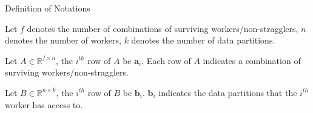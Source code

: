 \documentclass{beamer}
\begin{document}


\begin{frame}{Definition of Notations}

\begin{definition}
    Let $f$ denotes the number of combinations of surviving workers/non-stragglers, $n$ denotes the number of workers, $k$ denotes the number of data partitions.
\end{definition}

\begin{definition}
    Let $A \in \mathbb{R}^{f \times n}$, the $i^{th}$ row of $A$ be $\boldsymbol{a}_i$. Each row of $A$ indicates a combination of surviving workers/non-stragglers.
\end{definition}

\begin{definition}
    Let $B \in \mathbb{R}^{n \times k}$, the $i^{th}$ row of $B$ be $\boldsymbol{b}_i$. $\boldsymbol{b}_i$ indicates the data partitions that the $i^{th}$ worker has access to.
\end{definition}

\end{frame}
\end{document}
